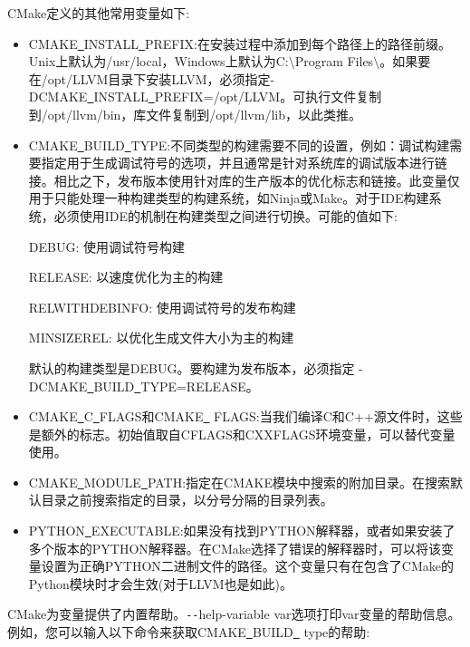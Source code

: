CMake定义的其他常用变量如下:\par

\begin{itemize}
\item CMAKE\underline{~}INSTALL\underline{~}PREFIX:在安装过程中添加到每个路径上的路径前缀。Unix上默认为\allowbreak /usr/local，Windows上默认为C:$\setminus$Program Files$\setminus$。如果要在/opt/LLVM目录下安装LLVM，必须指定-DCMAKE\underline{~}INSTALL\underline{~}PREFIX=/opt/LLVM。可执行文件复制到/opt/llvm/bin，库文件复制到/opt/llvm/lib，以此类推。

\item CMAKE\underline{~}BUILD\underline{~}TYPE:不同类型的构建需要不同的设置，例如：调试构建需要指定用于生成调试符号的选项，并且通常是针对系统库的调试版本进行链接。相比之下，发布版本使用针对库的生产版本的优化标志和链接。此变量仅用于只能处理一种构建类型的构建系统，如Ninja或Make。对于IDE构建系统，必须使用IDE的机制在构建类型之间进行切换。可能的值如下:\par
DEBUG: 使用调试符号构建\par
RELEASE: 以速度优化为主的构建\par
RELWITHDEBINFO: 使用调试符号的发布构建\par
MINSIZEREL: 以优化生成文件大小为主的构建\par
默认的构建类型是DEBUG。要构建为发布版本，必须指定 -DCMAKE\underline{~}BUILD\underline{~}TYPE=RELE\allowbreak ASE。\par

\item CMAKE\underline{~}C\underline{~}FLAGS和CMAKE\underline{~} FLAGS:当我们编译C和C++源文件时，这些是额外的标志。初始值取自CFLAGS和CXXFLAGS环境变量，可以替代变量使用。

\item CMAKE\underline{~}MODULE\underline{~}PATH:指定在CMAKE模块中搜索的附加目录。在搜索默认目录之前搜索指定的目录，以分号分隔的目录列表。

\item PYTHON\underline{~}EXECUTABLE:如果没有找到PYTHON解释器，或者如果安装了多个版本的PYTHON解释器。在CMake选择了错误的解释器时，可以将该变量设置为正确PYTHON二进制文件的路径。这个变量只有在包含了CMake的Python模块时才会生效(对于LLVM也是如此)。
\end{itemize}

CMake为变量提供了内置帮助。\verb|--|help-variable var选项打印var变量的帮助信息。例如，您可以输入以下命令来获取CMAKE\underline{~}BUILD\underline{~} type的帮助:\par

